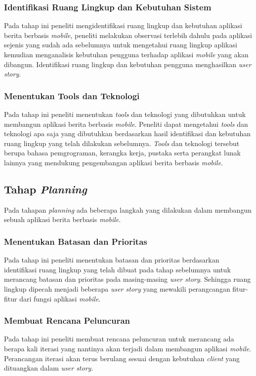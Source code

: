 \begin{spacing}{2}
    \subsubsection{Identifikasi Ruang Lingkup dan Kebutuhan Sistem}
      Pada tahap ini peneliti mengidentifikasi ruang lingkup dan kebutuhan aplikasi berita berbasis \emph{mobile}, peneliti melakukan observasi terlebih dahulu pada aplikasi sejenis yang sudah ada sebelumnya untuk mengetahui ruang lingkup aplikasi kemudian menganalisis kebutuhan pengguna terhadap aplikasi \emph{mobile} yang akan dibangun. Identifikasi ruang lingkup dan kebutuhan pengguna menghasilkan \emph{user story}.

    \subsubsection{Menentukan Tools dan Teknologi}
      Pada tahap ini peneliti menentukan \emph{tools} dan teknologi yang dibutuhkan untuk membangun aplikasi berita berbasis \emph{mobile}. Peneliti dapat mengetahui \emph{tools} dan teknologi apa saja yang dibutuhkan berdasarkan hasil identifikasi dan kebutuhan ruang lingkup yang telah dilakukan sebelumnya. \emph{Tools} dan teknologi tersebut berupa bahasa pemgrograman, kerangka kerja, pustaka serta perangkat lunak lainnya yang mendukung pengembangan aplikasi berita berbasis \emph{mobile}.

  \subsection{Tahap \emph{Planning}}
    Pada tahapan \emph{planning} ada beberapa langkah yang dilakukan dalam membangun sebuah aplikasi berita berbasis \emph{mobile}.

    \subsubsection{Menentukan Batasan dan Prioritas}
      Pada tahap ini peneliti menentukan batasan dan prioritas berdasarkan identifikasi ruang lingkup yang telah dibuat pada tahap sebelumnya untuk merancang batasan dan prioritas pada masing-masing \emph{user story}. Sehingga ruang lingkup dipecah menjadi beberapa \emph{user story} yang mewakili perangcangan fitur-fitur dari fungsi aplikasi \emph{mobile}.

    \subsubsection{Membuat Rencana Peluncuran}
      Pada tahap ini peneliti membuat rencana peluncuran untuk merancang ada berapa kali iterasi yang nantinya akan terjadi dalam membangun aplikasi \emph{mobile}. Perancangan iterasi akan terus berulang sesuai dengan kebutuhan \emph{client} yang dituangkan dalam \emph{user story}.


\end{spacing}

